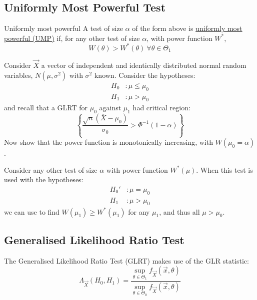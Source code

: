 \documentclass[../Main.tex]{subfiles}
\begin{document}
\subsection{Uniformly Most Powerful Test}
\begin{definition}{Uniformly most powerful}
    A test of size $\alpha$ of the form above is \underline{uniformly most powerful (UMP)} if, for any other test of size $\alpha$, with power function $W^*$,
    \begin{equation*}
        W(\theta) > W^*(\theta)~\forall \theta \in \Theta_1
    \end{equation*}
\end{definition}
\begin{example}
    Consider $\vec{X}$ a vector of independent and identically distributed normal random variables, $N(\mu, \sigma^2)$ with $\sigma^2$ known. Consider the hypotheses:
    \begin{align*}
        H_0&: \mu \leq \mu_0 \\
        H_1&: \mu > \mu_0
    \end{align*}
    and recall that a GLRT for $\mu_0$ against $\mu_1$ had critical region:
    \begin{equation*}
        \left\{\frac{\sqrt{n} \left(\overline{X} - \mu_0\right)}{\sigma_0} > \Phi^{-1}(1 - \alpha)\right\}
    \end{equation*}
    Now show that the power function is monotonically increasing, with $W(\mu_0 = \alpha)$.

    Consider any other test of size $\alpha$ with power function $W^*(\mu)$. When this test is used with the hypotheses:
    \begin{align*}
        H_0'&: \mu = \mu_0 \\
        H_1&: \mu > \mu_0
    \end{align*}
    we can use  to find $W(\mu_1) \geq W^*(\mu_1)$ for any $\mu_1$, and thus all $\mu > \mu_0$.
\end{example}
\subsection{Generalised Likelihood Ratio Test}
The Generalised Likelihood Ratio Test (GLRT) makes use of the GLR statistic:
\begin{equation*}
    \Lambda_{\vec{X}}(H_0, H_1) = \frac{\sup_{\theta \in \Theta_1}f_{\vec{X}}(\vec{x}, \theta)}{\sup_{\theta \in \Theta_0} f_{\vec{X}}(\vec{x}, \theta)}
\end{equation*}
\end{document}
